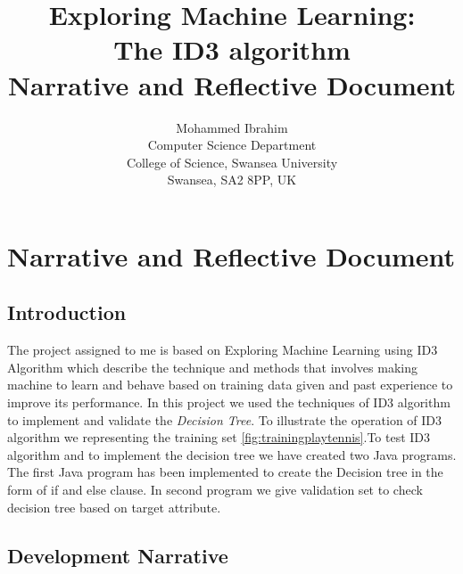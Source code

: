\documentclass{report}
\begin{document}
\title{Exploring Machine Learning:\\
  The ID3 algorithm\\
  		Narrative and Reflective Document}


\author{Mohammed Ibrahim\\
 Computer Science Department\\
  College of Science, Swansea University\\
  Swansea, SA2 8PP, UK
}

\maketitle



\tableofcontents
\pagebreak

\chapter{Narrative and Reflective Document}
\label{sec:nar}


\section{Introduction}
\label{sec:intro}

The project assigned to me is based on Exploring Machine Learning using ID3 Algorithm which describe the technique and methods that involves making machine to learn and behave based on training data given and past experience to improve its performance. In this project we used the techniques of ID3 algorithm to implement and validate the \emph{Decision Tree}. To illustrate the operation of ID3 algorithm we representing the training set \ref{fig:trainingplaytennis}.To test ID3 algorithm and to implement the decision  tree we have created two Java programs. The first Java program has been implemented to create the Decision tree in the form of if and else clause. In second program we give validation set to check decision tree based on target attribute.

\section{Development Narrative}
\label{sec:dev}
\end{document}
